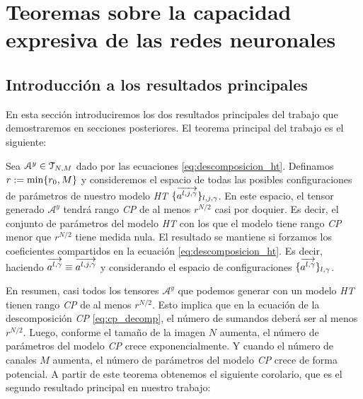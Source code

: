 \chapter{Teoremas sobre la capacidad expresiva de las redes neuronales} \label{chapter:teoremas_y_demostraciones}

\section{Introducción a los resultados principales}

En esta sección introduciremos los dos resultados principales del trabajo que demostraremos en secciones posteriores. El teorema principal del trabajo es el siguiente:

\begin{teorema} \label{teorema:teorema_principal_introduccion}

Sea $\mathcal{A}^y \in \mathcal{T}_{N, M}$ dado por las ecuaciones \eqref{eq:descomposicion_ht}. Definamos $r := \min \{ r_0, M \}$ y consideremos el espacio de todas las posibles configuraciones de parámetros de nuestro modelo \textit{HT} $\{  \overrightarrow{a^{l, j, \gamma}} \}_{l, j, \gamma}$. En este espacio, el tensor generado $\mathcal{A}^y$ tendrá rango \textit{CP} de al menos $r^{N/2}$ casi por doquier. Es decir, el conjunto de parámetros del modelo \textit{HT} con los que el modelo tiene rango \textit{CP} menor que $r^{N/2}$ tiene medida nula. El resultado se mantiene si forzamos los coeficientes compartidos en la ecuación \eqref{eq:descomposicion_ht}. Es decir, haciendo $\overrightarrow{a^{l, \gamma}} \equiv \overrightarrow{a^{l, j, \gamma}}$ y considerando el espacio de configuraciones $\{ \overrightarrow{a^{l, \gamma}}  \}_{l, \gamma}$.

\end{teorema}

En resumen, casi todos los tensores $\mathcal{A}^y$ que podemos generar con un modelo \textit{HT} tienen rango \textit{CP} de al menos $r^{N/2}$. Esto implica que en la ecuación de la descomposición \textit{CP} \eqref{eq:cp_decomp}, el número de sumandos deberá ser al menos $r^{N/2}$. Luego, conforme el tamaño de la imagen $N$ aumenta, el número de parámetros del modelo \textit{CP} crece exponencialmente. Y cuando el número de canales $M$ aumenta, el número de parámetros del modelo \textit{CP} crece de forma potencial. A partir de este teorema obtenemos el siguiente corolario, que es el segundo resultado principal en nuestro trabajo:

